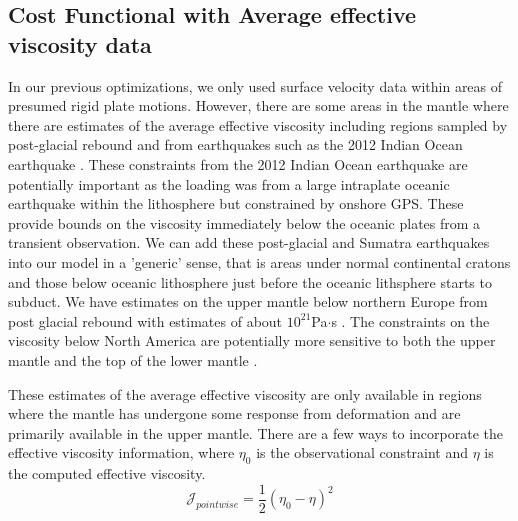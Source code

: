 \documentclass[12pt]{article}
\begin{document}
\subsection*{Cost Functional with Average effective viscosity data}
In our previous optimizations, we only used surface velocity data within areas of presumed rigid plate motions. However, there are some areas in the mantle where there are estimates of the average effective viscosity including regions sampled by post-glacial rebound and from earthquakes such as the 2012 Indian Ocean earthquake \citep{hu2016asthenosphere}.  These constraints from the 2012 Indian Ocean earthquake are potentially important as the loading was from a large intraplate oceanic earthquake within the lithosphere but constrained by onshore GPS. These provide bounds on the viscosity immediately below the oceanic plates from a transient observation. We can add these post-glacial and Sumatra earthquakes into our model in a 'generic' sense, that is areas under normal continental cratons and those below oceanic lithosphere just before the oceanic lithsphere starts to subduct. We have estimates on the upper mantle  below northern Europe from post glacial rebound with estimates of about $10^{21}$Pa$\cdot$s \citep{cathles2015viscosity}. The constraints on the viscosity below North America are potentially more sensitive to both the upper mantle and the top of the lower mantle \citep{mitrovica1995constraints,simons1997localization}. 

These estimates of the average effective viscosity are only available in regions where the mantle has undergone some response from deformation and are primarily available in the upper mantle.   There are a few ways to incorporate the effective viscosity information, where $\eta_0$ is the observational constraint and $\eta$ is the computed effective viscosity.
\begin{equation}
   \mathcal{J}_{pointwise}=  \frac{1}{2}(\eta_0 - \eta)^{2}
\label{eq:pointwise}
\end{equation}



 
\end{document}
